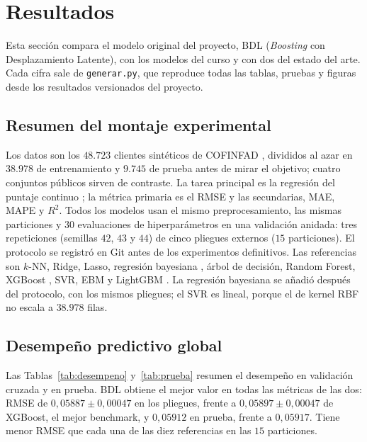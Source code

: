 \section{Resultados}\label{sec:resultados}

Esta sección compara el modelo original del proyecto, BDL (\emph{Boosting} con Desplazamiento Latente), con los modelos
del curso y con dos del estado del arte. Cada cifra sale de \texttt{generar.py}, que reproduce todas las tablas,
pruebas y figuras desde los resultados versionados del proyecto.

\subsection{Resumen del montaje experimental}\label{sec:res-montaje}

Los datos son los $48.723$ clientes sintéticos de COFINFAD \citep{munoz2025}, divididos al azar en
$38.978$ de entrenamiento y $9.745$ de prueba antes de mirar el objetivo; cuatro conjuntos públicos sirven de
contraste. La tarea principal es la regresión del puntaje continuo \cp; la métrica primaria es el RMSE y las
secundarias, MAE, MAPE y $R^2$. Todos los modelos usan el mismo preprocesamiento, las mismas particiones y $30$
evaluaciones de hiperparámetros en una validación anidada: tres repeticiones (semillas $42$, $43$ y $44$) de cinco
pliegues externos ($15$ particiones). El protocolo se registró en Git antes de los experimentos definitivos. Las referencias son $k$-NN, Ridge, Lasso, regresión bayesiana \citep{mackay1992}, árbol de decisión,
Random Forest, XGBoost \citep{chen2016xgboost}, SVR, EBM \citep{nori2019interpretml} y LightGBM \citep{ke2017}. La
regresión bayesiana se añadió después del protocolo, con los mismos pliegues; el SVR es lineal, porque el de kernel
RBF no escala a $38.978$ filas.

\subsection{Desempeño predictivo global}

Las Tablas~\ref{tab:desempeno} y~\ref{tab:prueba} resumen el desempeño en validación cruzada y en prueba. BDL obtiene
el mejor valor en todas las métricas de las dos: RMSE de $0{,}05887 \pm 0{,}00047$ en los pliegues, frente a
$0{,}05897 \pm 0{,}00047$ de XGBoost, el mejor benchmark, y $0{,}05912$ en prueba, frente a $0{,}05917$. Tiene menor
RMSE que cada una de las diez referencias en las $15$ particiones.

